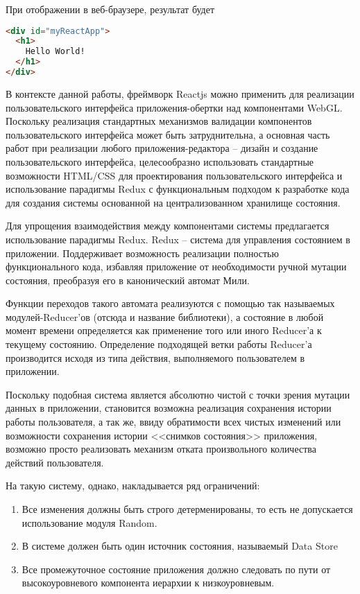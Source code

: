 При отображении в веб-браузере, результат будет

\begin{lstlisting}[language=HTML, label=lst:domain:html]
<div id="myReactApp">
  <h1>
    Hello World!
  </h1>
</div>
\end{lstlisting}

В контексте данной работы, фреймворк Reactjs можно применить для реализации пользовательского интерфейса приложения-обертки
над компонентами WebGL. Поскольку реализация стандартных механизмов валидации компонентов пользовательского интерфейса может
быть затруднительна, а основная часть работ при реализации любого приложения-редактора -- дизайн и создание пользовательского
интерфейса, целесообразно использовать стандартные возможности HTML/CSS для проектирования пользовательского интерфейса и
использование парадигмы Redux с функциональным подходом к разработке кода для создания системы основанной на централизованном
хранилище состояния.

Для упрощения взаимодействия между компонентами системы предлагается использование парадигмы Redux. Redux -- система для управления
состоянием в приложении. Поддерживает возможность реализации полностью функционального кода, избавляя приложение от необходимости
ручной мутации состояния, преобразуя его в канонический автомат Мили.

Функции переходов такого автомата реализуются с помощью так называемых модулей-Reducer'ов (отсюда и название библиотеки), а состояние
в любой момент времени определяется как применение того или иного Reducer'а к текущему состоянию. Определение подходящей ветки
работы Reducer'а производится исходя из типа действия, выполняемого пользователем в приложении.

Поскольку подобная система является абсолютно чистой с точки зрения мутации данных в приложении, становится возможна реализация
сохранения истории работы пользователя, а так же, ввиду обратимости всех чистых изменений или возможности сохранения истории
<<снимков состояния>> приложения, возможно просто реализовать механизм отката произвольного количества действий пользователя.

На такую систему, однако, накладывается ряд ограничений:

\begin{enumerate}[label=\arabic*.]
\item Все изменения должны быть строго детерменированы, то есть не допускается использование модуля Random.
\item В системе должен быть один источник состояния, называемый Data Store
\item Все промежуточное состояние приложения должно следовать по пути от высокоуровневого компонента иерархии к низкоуровневым.
\end{enumerate}

